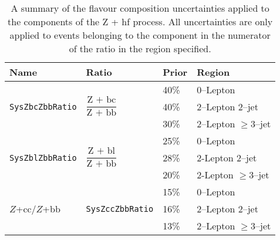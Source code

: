 \begin{table}[!htbp]
  \begin{tabular}{llll}
    \toprule
    {\bfseries Name} & {\bfseries Ratio} & {\bfseries Prior} & {\bfseries Region}\\ 
    \midrule
    \multirow{ 3}{*}{\texttt{SysZbcZbbRatio}} & \multirow{ 3}{*}{$\dfrac{\text{Z + bc}}{\text{Z + bb}}$} & 40\% & 0--Lepton \\
                     &								    & 40\% & 2--Lepton 2--jet \\
                     &								    & 30\% & 2--Lepton $\geq$3--jet \\
    \multirow{ 3}{*}{\texttt{SysZblZbbRatio}} & \multirow{ 3}{*}{$\dfrac{\text{Z + bl}}{\text{Z + bb}}$} & 25\% & 0--Lepton \\
                     &								    & 28\% & 2-Lepton 2--jet \\
                     &								    & 20\% & 2-Lepton $\geq$3--jet \\
    \multirow{ 3}{*}{$Z$+cc/$Z$+bb} & \multirow{ 3}{*}{\texttt{SysZccZbbRatio}}    & 15\% & 0--Lepton \\
                     &								    &  16\% & 2--Lepton 2--jet \\
                     &								    &   13\% & 2--Lepton $\geq$3--jet \\
    \bottomrule
  \end{tabular}
  \caption{A summary of the flavour composition uncertainties applied to the
    components of the Z + hf process. All uncertainties are only applied to
    events belonging to the component in the numerator of the ratio in the
    region specified.
  }
  \label{tab:zjets-flavour-comp}
\end{table}